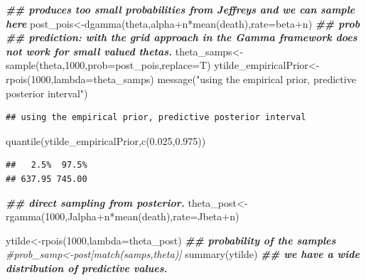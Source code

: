 \documentclass[
]{book}
\newenvironment{Shaded}{\begin{snugshade}}{\end{snugshade}}
\newcommand{\AttributeTok}[1]{\textcolor[rgb]{0.77,0.63,0.00}{#1}}
\newcommand{\CommentTok}[1]{\textcolor[rgb]{0.56,0.35,0.01}{\textit{#1}}}
\newcommand{\DecValTok}[1]{\textcolor[rgb]{0.00,0.00,0.81}{#1}}
\newcommand{\DocumentationTok}[1]{\textcolor[rgb]{0.56,0.35,0.01}{\textbf{\textit{#1}}}}
\newcommand{\FloatTok}[1]{\textcolor[rgb]{0.00,0.00,0.81}{#1}}
\newcommand{\FunctionTok}[1]{\textcolor[rgb]{0.00,0.00,0.00}{#1}}
\newcommand{\NormalTok}[1]{#1}
\newcommand{\OtherTok}[1]{\textcolor[rgb]{0.56,0.35,0.01}{#1}}
\newcommand{\SpecialCharTok}[1]{\textcolor[rgb]{0.00,0.00,0.00}{#1}}
\newcommand{\StringTok}[1]{\textcolor[rgb]{0.31,0.60,0.02}{#1}}
\theoremstyle{definition}
\theoremstyle{definition}
\theoremstyle{definition}
\theoremstyle{definition}
\theoremstyle{remark}
\begin{document}
\begin{Shaded}
\begin{Highlighting}[]
 \DocumentationTok{\#\# produces too small probabilities from Jeffrey\textquotesingle{}s and we can sample here}
\NormalTok{ post\_pois}\OtherTok{\textless{}{-}}\FunctionTok{dgamma}\NormalTok{(theta,alpha}\SpecialCharTok{+}\NormalTok{n}\SpecialCharTok{*}\FunctionTok{mean}\NormalTok{(death),}\AttributeTok{rate=}\NormalTok{beta}\SpecialCharTok{+}\NormalTok{n) }\DocumentationTok{\#\# prob}
\DocumentationTok{\#\#  prediction:  with the grid approach in the Gamma framework does not work for small valued thetas.}
\NormalTok{ theta\_samps}\OtherTok{\textless{}{-}}\FunctionTok{sample}\NormalTok{(theta,}\DecValTok{1000}\NormalTok{,}\AttributeTok{prob=}\NormalTok{post\_pois,}\AttributeTok{replace=}\NormalTok{T)}
\NormalTok{  ytilde\_empiricalPrior}\OtherTok{\textless{}{-}}\FunctionTok{rpois}\NormalTok{(}\DecValTok{1000}\NormalTok{,}\AttributeTok{lambda=}\NormalTok{theta\_samps)}
  \FunctionTok{message}\NormalTok{(}\StringTok{"using the empirical prior, predictive posterior interval"}\NormalTok{)}
\end{Highlighting}
\end{Shaded}

\begin{verbatim}
## using the empirical prior, predictive posterior interval
\end{verbatim}

\begin{Shaded}
\begin{Highlighting}[]
   \FunctionTok{quantile}\NormalTok{(ytilde\_empiricalPrior,}\FunctionTok{c}\NormalTok{(}\FloatTok{0.025}\NormalTok{,}\FloatTok{0.975}\NormalTok{))}
\end{Highlighting}
\end{Shaded}

\begin{verbatim}
##   2.5%  97.5% 
## 637.95 745.00
\end{verbatim}

\begin{Shaded}
\begin{Highlighting}[]
 \DocumentationTok{\#\# direct sampling from posterior.}
\NormalTok{ theta\_post}\OtherTok{\textless{}{-}}\FunctionTok{rgamma}\NormalTok{(}\DecValTok{1000}\NormalTok{,Jalpha}\SpecialCharTok{+}\NormalTok{n}\SpecialCharTok{*}\FunctionTok{mean}\NormalTok{(death),}\AttributeTok{rate=}\NormalTok{Jbeta}\SpecialCharTok{+}\NormalTok{n)}
 
 
\NormalTok{   ytilde}\OtherTok{\textless{}{-}}\FunctionTok{rpois}\NormalTok{(}\DecValTok{1000}\NormalTok{,}\AttributeTok{lambda=}\NormalTok{theta\_post) }
 \DocumentationTok{\#\# probability of the samples }
 \CommentTok{\#prob\_samp\textless{}{-}post[match(samps,theta)]}
  \FunctionTok{summary}\NormalTok{(ytilde) }\DocumentationTok{\#\# we have a wide distribution of predictive values.}
\end{Highlighting}
\end{Shaded}
\end{document}
